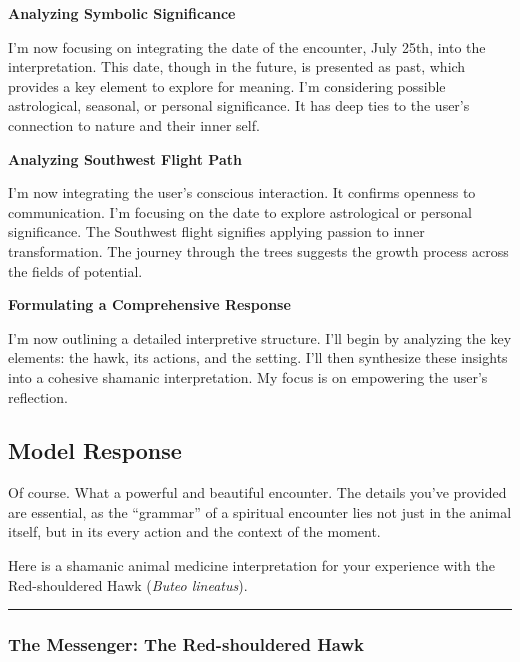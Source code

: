 \documentclass{article}
\begin{document}
\textbf{Analyzing Symbolic Significance}

I'm now focusing on integrating the date of the encounter, July 25th,
into the interpretation. This date, though in the future, is presented
as past, which provides a key element to explore for meaning. I'm
considering possible astrological, seasonal, or personal significance.
It has deep ties to the user's connection to nature and their inner
self.

\textbf{Analyzing Southwest Flight Path}

I'm now integrating the user's conscious interaction. It confirms
openness to communication. I'm focusing on the date to explore
astrological or personal significance. The Southwest flight signifies
applying passion to inner transformation. The journey through the trees
suggests the growth process across the fields of potential.

\textbf{Formulating a Comprehensive Response}

I'm now outlining a detailed interpretive structure. I'll begin by
analyzing the key elements: the hawk, its actions, and the setting. I'll
then synthesize these insights into a cohesive shamanic interpretation.
My focus is on empowering the user's reflection.



\subsection*{Model Response}\label{model-response}

Of course. What a powerful and beautiful encounter. The details you've
provided are essential, as the ``grammar'' of a spiritual encounter lies
not just in the animal itself, but in its every action and the context
of the moment.

Here is a shamanic animal medicine interpretation for your experience
with the Red-shouldered Hawk (\emph{Buteo lineatus}).

\begin{center}\rule{0.5\linewidth}{0.5pt}\end{center}

\subsubsection*{The Messenger: The Red-shouldered
Hawk}\label{the-messenger-the-red-shouldered-hawk}
\end{document}
